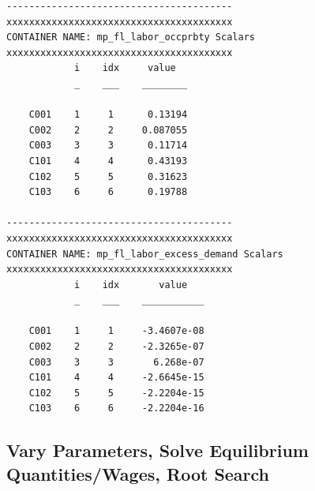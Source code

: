 \documentclass[
]{book}
\begin{document}
\begin{verbatim}
----------------------------------------
xxxxxxxxxxxxxxxxxxxxxxxxxxxxxxxxxxxxxxxx
CONTAINER NAME: mp_fl_labor_occprbty Scalars
xxxxxxxxxxxxxxxxxxxxxxxxxxxxxxxxxxxxxxxx
            i    idx     value  
            _    ___    ________

    C001    1     1      0.13194
    C002    2     2     0.087055
    C003    3     3      0.11714
    C101    4     4      0.43193
    C102    5     5      0.31623
    C103    6     6      0.19788

----------------------------------------
xxxxxxxxxxxxxxxxxxxxxxxxxxxxxxxxxxxxxxxx
CONTAINER NAME: mp_fl_labor_excess_demand Scalars
xxxxxxxxxxxxxxxxxxxxxxxxxxxxxxxxxxxxxxxx
            i    idx       value   
            _    ___    ___________

    C001    1     1     -3.4607e-08
    C002    2     2     -2.3265e-07
    C003    3     3       6.268e-07
    C101    4     4     -2.6645e-15
    C102    5     5     -2.2204e-15
    C103    6     6     -2.2204e-16
\end{verbatim}

\hypertarget{vary-parameters-solve-equilibrium-quantitieswages-root-search}{%
\subsection{Vary Parameters, Solve Equilibrium Quantities/Wages, Root Search}\label{vary-parameters-solve-equilibrium-quantitieswages-root-search}}
\end{document}
